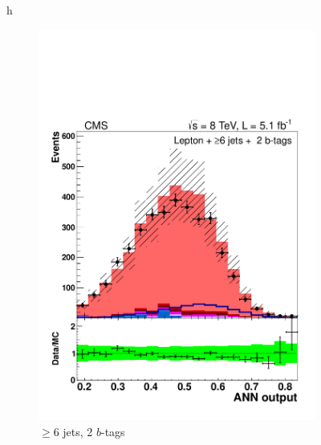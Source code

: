 \begin{figure}{h}
    \centering
    \begin{subfigure}[h]{0.31\textwidth}
        \includegraphics[width=\textwidth]{Figures/Analysis_1_Diagrams/d2MCPlots_CFMlpANN_cut3_jge6_t2_Combined_HtWgt.pdf}
        \caption{$\ge$6 jets, 2 $b$-tags}\label{lj_ANNoutput_8TeV_1}
      \end{subfigure}
      ~ %
      \begin{subfigure}[h]{0.31\textwidth}

\end{subfigure}
\end{figure}
